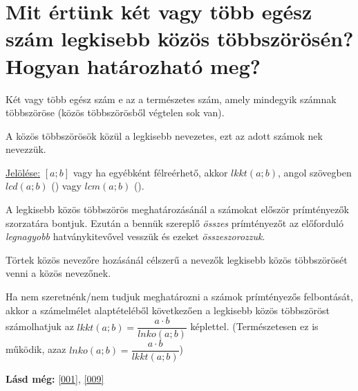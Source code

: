 
\section{Mit értünk két vagy több egész szám legkisebb közös többszörösén?
\texorpdfstring{\\}{}Hogyan határozható meg?}
\label{002}

\begin{defin}
Két vagy több egész szám e az a természetes szám,
amely mindegyik számnak többszöröse (közös többszörösből végtelen sok van).
\end{defin}

\begin{defin}
A közös többszörösök közül a legkisebb nevezetes, ezt az adott számok
nek nevezzük.

\uline{Jelölése:} $[a; b]$ vagy ha egyébként félreérhető, akkor $lkkt(a; b)$,
angol szövegben $lcd(a; b)$ () vagy $lcm(a;
b)$ ().
\end{defin}

\begin{method}
A legkisebb közös többszörös meghatározásánál a számokat először prímtényezők
szorzatára bontjuk. Ezután a bennük szereplő \emph{összes} prímtényezőt az
előforduló \emph{legnagyobb} hatványkitevővel vesszük és ezeket
\emph{összeszorozzuk}.
\end{method}

\begin{note2}
Törtek közös nevezőre hozásánál célszerű a nevezők legkisebb közös többszörösét
venni a közös nevezőnek.
\end{note2}

\begin{method2}
Ha nem szeretnénk/nem tudjuk meghatározni a számok prímtényezős felbontását,
akkor a számelmélet alaptételéből következően a legkisebb közös többszöröst
számolhatjuk az $lkkt(a; b) = \dfrac{a \cdot b}{lnko(a; b)}$ képlettel.
(Természetesen ez  is működik, azaz $lnko(a; b) = \dfrac{a
\cdot b}{lkkt(a; b)}$)
\end{method2}

\textbf{Lásd még:} \ref{001}, \ref{009}

